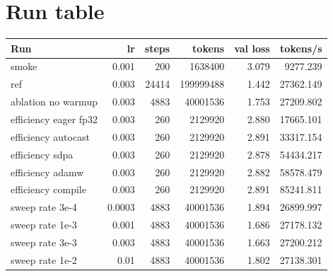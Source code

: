 \documentclass[11pt,a4paper]{article}
\begin{document}
\section{Run table}
\begin{table}[htbp]
\centering
\begin{tabular}{@{}lrrrrr@{}}
\toprule
Run & lr & steps & tokens & val loss & tokens/s \\
\midrule
smoke & 0.001 & 200 & 1638400 & 3.079 & 9277.239 \\
ref & 0.003 & 24414 & 199999488 & 1.442 & 27362.149 \\
ablation no warmup & 0.003 & 4883 & 40001536 & 1.753 & 27209.802 \\
efficiency eager fp32 & 0.003 & 260 & 2129920 & 2.880 & 17665.101 \\
efficiency autocast & 0.003 & 260 & 2129920 & 2.891 & 33317.154 \\
efficiency sdpa & 0.003 & 260 & 2129920 & 2.878 & 54434.217 \\
efficiency adamw & 0.003 & 260 & 2129920 & 2.882 & 58578.479 \\
efficiency compile & 0.003 & 260 & 2129920 & 2.891 & 85241.811 \\
sweep rate 3e-4 & 0.0003 & 4883 & 40001536 & 1.894 & 26899.997 \\
sweep rate 1e-3 & 0.001 & 4883 & 40001536 & 1.686 & 27178.132 \\
sweep rate 3e-3 & 0.003 & 4883 & 40001536 & 1.663 & 27200.212 \\
sweep rate 1e-2 & 0.01 & 4883 & 40001536 & 1.802 & 27138.301 \\
\bottomrule
\end{tabular}
\end{table}
\end{document}
